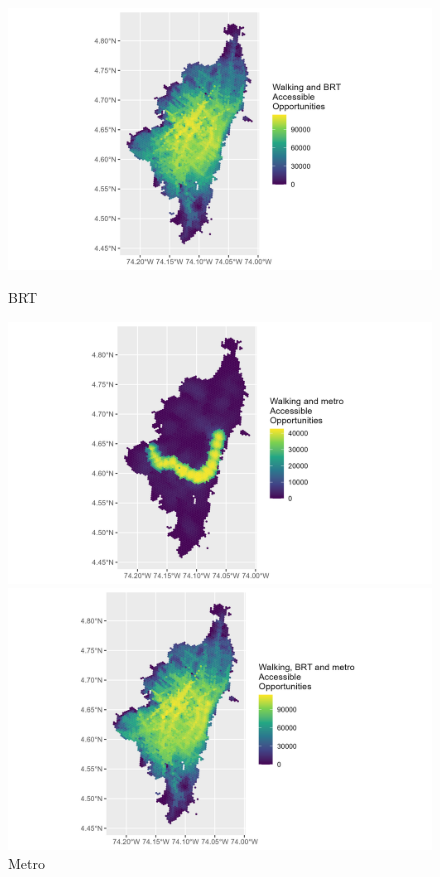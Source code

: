 \documentclass[12pt, a4paper]{report}
\begin{document}
\begin{figure}[H]
    \centering
    \begin{minipage}{0.45\textwidth}
        \centering
        \includegraphics[width=1.3\linewidth]{Data/Results/Images/Access_BRT_base.png}
         \caption{BRT}
        \label{fig:Results_Opportunities}
    \end{minipage}%
    \hfill
    \begin{minipage}{0.45\textwidth}
        \centering
        \includegraphics[width=1.3\linewidth]{Data/Results/Images/Access_Metro_base.png}
        \caption{Metro}
        \label{fig:Results_Walking}
    \end{minipage}
    \begin{minipage}{0.45\textwidth}
        \centering
        \includegraphics[width=1.3\linewidth]{Data/Results/Images/Access_BRT_Metro_base.png}

\end{minipage}
\end{figure}
\end{document}
